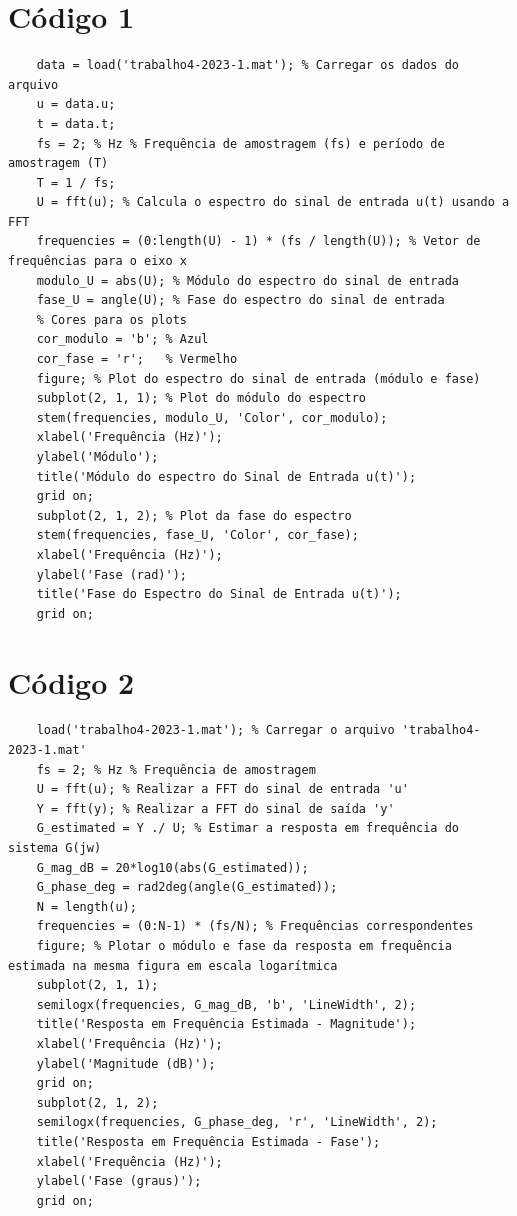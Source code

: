 \documentclass[10pt]{article}
\begin{document}
\begin{appendices}

\section{Código 1}

\begin{verbatim}
    data = load('trabalho4-2023-1.mat'); % Carregar os dados do arquivo
    u = data.u;
    t = data.t;
    fs = 2; % Hz % Frequência de amostragem (fs) e período de amostragem (T)
    T = 1 / fs;
    U = fft(u); % Calcula o espectro do sinal de entrada u(t) usando a FFT
    frequencies = (0:length(U) - 1) * (fs / length(U)); % Vetor de frequências para o eixo x
    modulo_U = abs(U); % Módulo do espectro do sinal de entrada
    fase_U = angle(U); % Fase do espectro do sinal de entrada
    % Cores para os plots
    cor_modulo = 'b'; % Azul
    cor_fase = 'r';   % Vermelho
    figure; % Plot do espectro do sinal de entrada (módulo e fase)
    subplot(2, 1, 1); % Plot do módulo do espectro
    stem(frequencies, modulo_U, 'Color', cor_modulo);
    xlabel('Frequência (Hz)');
    ylabel('Módulo');
    title('Módulo do espectro do Sinal de Entrada u(t)');
    grid on;
    subplot(2, 1, 2); % Plot da fase do espectro
    stem(frequencies, fase_U, 'Color', cor_fase);
    xlabel('Frequência (Hz)');
    ylabel('Fase (rad)');
    title('Fase do Espectro do Sinal de Entrada u(t)');
    grid on;
\end{verbatim}

\newpage

\section{Código 2}

\begin{verbatim}
    load('trabalho4-2023-1.mat'); % Carregar o arquivo 'trabalho4-2023-1.mat'
    fs = 2; % Hz % Frequência de amostragem
    U = fft(u); % Realizar a FFT do sinal de entrada 'u'
    Y = fft(y); % Realizar a FFT do sinal de saída 'y'
    G_estimated = Y ./ U; % Estimar a resposta em frequência do sistema G(jw)
    G_mag_dB = 20*log10(abs(G_estimated));
    G_phase_deg = rad2deg(angle(G_estimated));
    N = length(u);
    frequencies = (0:N-1) * (fs/N); % Frequências correspondentes
    figure; % Plotar o módulo e fase da resposta em frequência estimada na mesma figura em escala logarítmica
    subplot(2, 1, 1);
    semilogx(frequencies, G_mag_dB, 'b', 'LineWidth', 2);
    title('Resposta em Frequência Estimada - Magnitude');
    xlabel('Frequência (Hz)');
    ylabel('Magnitude (dB)');
    grid on;
    subplot(2, 1, 2);
    semilogx(frequencies, G_phase_deg, 'r', 'LineWidth', 2);
    title('Resposta em Frequência Estimada - Fase');
    xlabel('Frequência (Hz)');
    ylabel('Fase (graus)');
    grid on; 
\end{verbatim}


\end{appendices}
\end{document}
